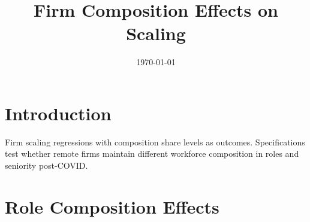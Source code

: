 \documentclass[11pt]{article}
\title{Firm Composition Effects on Scaling}
\date{\today}
\begin{document}
\maketitle

\section{Introduction}

Firm scaling regressions with composition share levels as outcomes. Specifications test whether remote firms maintain different workforce composition in roles and seniority post-COVID.


\section{Role Composition Effects}
\end{document}

